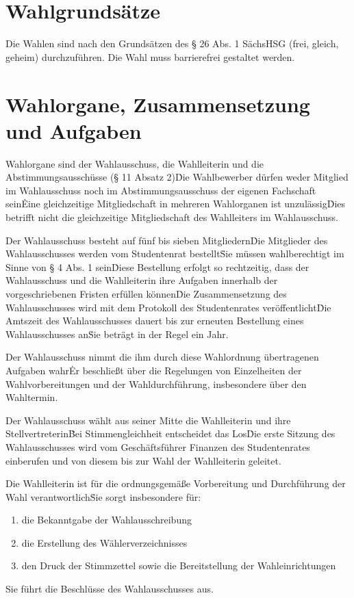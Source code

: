 \begin{multicols}{2}
\section  {Wahlgrundsätze}
\Abs \Satz Die Wahlen sind nach den Grundsätzen des § 26 Abs. 1 SächsHSG (frei, gleich, geheim) durchzuführen.
\Abs \Satz Die Wahl muss barrierefrei gestaltet werden.

\section {Wahlorgane, Zusammensetzung und Aufgaben}
\Abs \Satz Wahlorgane sind der Wahlausschuss, die Wahlleiterin und die Abstimmungsausschüsse (§ 11 Absatz 2)\. Die Wahlbewerber dürfen weder Mitglied im Wahlausschuss noch im Abstimmungsausschuss der eigenen Fachschaft sein\. Eine gleichzeitige Mitgliedschaft in mehreren Wahlorganen ist unzulässig\. Dies betrifft nicht die gleichzeitige Mitgliedschaft des Wahlleiters im Wahlausschuss.

\Abs \Satz Der Wahlausschuss besteht auf fünf bis sieben Mitgliedern\. Die Mitglieder des Wahlausschusses werden vom Studentenrat bestellt\. Sie müssen wahlberechtigt im Sinne von § 4 Abs. 1 sein\. Diese Bestellung erfolgt so rechtzeitig, dass der Wahlausschuss und die Wahlleiterin ihre Aufgaben innerhalb der vorgeschriebenen Fristen erfüllen können\. Die Zusammensetzung des Wahlausschusses wird mit dem Protokoll des Studentenrates veröffentlicht\. Die Amtszeit des Wahlausschusses dauert bis zur erneuten Bestellung eines Wahlausschusses an\. Sie beträgt in der Regel ein Jahr.

\Abs \Satz Der Wahlausschuss nimmt die ihm durch diese Wahlordnung übertragenen Aufgaben wahr\. Er beschließt über die Regelungen von Einzelheiten der Wahlvorbereitungen und der Wahldurchführung, insbesondere über den Wahltermin.

\Abs \Satz Der Wahlausschuss wählt aus seiner Mitte die Wahlleiterin und ihre Stellvertreterin\. Bei Stimmengleichheit entscheidet das Los\. Die erste Sitzung des Wahlausschusses wird vom Geschäftsführer Finanzen des Studentenrates einberufen und von diesem bis zur Wahl der Wahlleiterin geleitet.

\Abs \Satz Die Wahlleiterin ist für die ordnungsgemäße Vorbereitung und Durchführung der Wahl verantwortlich\. Sie sorgt insbesondere für: 
\begin{enumerate}
\item die Bekanntgabe der Wahlausschreibung
\item die Erstellung des Wählerverzeichnisses
\item den Druck der Stimmzettel sowie die Bereitstellung der Wahleinrichtungen
\end{enumerate}
\Satz Sie führt die Beschlüsse des Wahlausschusses aus.


\end{multicols}
